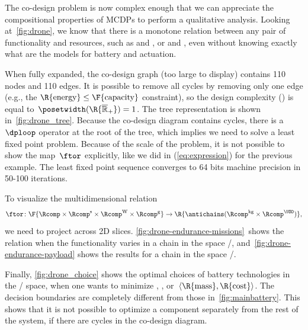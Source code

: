 The co-design problem is now complex enough that we can appreciate
the compositional properties of MCDPs to perform a qualitative analysis.
Looking at~\cref{fig:drone}, we know that there is a monotone relation
between any pair of functionality and resources, such as 
and , or  and , even without knowing
exactly what are the models for battery and actuation.

When fully expanded, the co-design graph (too large to display) contains
110 nodes and 110 edges. It is possible to remove all cycles by removing
only one edge (e.g., the $\R{\text{energy}}\leq\text{\F{\text{capacity}}}$
constraint), so the design complexity ()
is equal to~$\posetwidth(\R{\overline{\mathbb{R}}_{+}})=1$. The
tree representation is shown in~\cref{fig:drone_tree}. Because the
co-design diagram contains cycles, there is a~$\dploop$ operator
at the root of the tree, which implies we need to solve a least fixed
point problem. Because of the scale of the problem, it is not possible
to show the map~$\ftor$ explicitly, like we did in (\ref{eq:expression})
for the previous example. The least fixed point sequence converges
to 64 bits machine precision in 50-100 iterations.

To visualize the multidimensional relation
\[
\ftor\colon\F{\Rcomp\times\Rcomp^{\text{s}}\times\Rcomp^{\text{W}}\times\Rcomp^{\text{g}}}\rightarrow\R{\antichains(\Rcomp^{\text{kg}}\times\Rcomp^{\USD})},
\]
we need to project across 2D slices. \cref{fig:drone-endurance-missions}~shows
the relation when the functionality varies in a chain in the space
/, and~\cref{fig:drone-endurance-payload}
shows the results for a chain in the space /.

Finally, \cref{fig:drone_choice} shows the optimal choices of battery
technologies in the / space, when one
wants to minimize , , or~$\left\langle \R{\text{mass}},\R{\text{cost}}\right\rangle $.
The decision boundaries are completely different from those in~\cref{fig:mainbattery}.
This shows that it is not possible to optimize a component separately
from the rest of the system, if there are cycles in the co-design
diagram.

